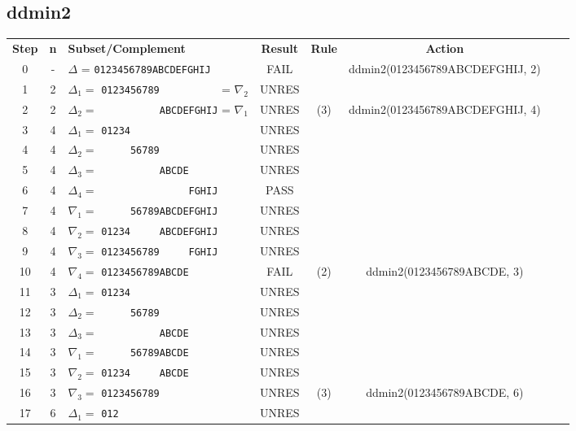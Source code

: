 \documentclass[10pt, a4paper]{article}
\begin{document}
\subsection{ddmin2}
\begin{table}[H]
\def\arraystretch{1.2}
\center
\begin{tabular}{|c|c|l|c|c|c|c|p{1.3cm}|}
	\hline
	\textbf{Step} & \textbf{n} & \textbf{Subset/Complement} &   \textbf{Result} & \textbf{Rule} & \textbf{Action} \\ 
	\hlineB{3}
	0  & - & $\Delta$ = \verb+0123456789ABCDEFGHIJ+ & FAIL &&
	ddmin2(0123456789ABCDEFGHIJ, 2) \\ \hline
	
	1  & 2 & $\Delta_1=$ \verb+0123456789          + = $\nabla_2$ & UNRES && \\
	2  & 2 & $\Delta_2=$ \verb+          ABCDEFGHIJ+ = $\nabla_1$ & UNRES & (3) & ddmin2(0123456789ABCDEFGHIJ, 4) \\ \hline 
	3  & 4 & $\Delta_1=$ \verb+01234                +& UNRES && \\
	4  & 4 & $\Delta_2=$ \verb+     56789           +& UNRES && \\
	5  & 4 & $\Delta_3=$ \verb+          ABCDE      +& UNRES && \\
	6  & 4 & $\Delta_4=$ \verb+               FGHIJ +& PASS && \\
	7  & 4 & $\nabla_1=$ \verb+     56789ABCDEFGHIJ +& UNRES && \\
	8  & 4 & $\nabla_2=$ \verb+01234     ABCDEFGHIJ +& UNRES && \\
	9  & 4 & $\nabla_3=$ \verb+0123456789     FGHIJ +& UNRES && \\
	10 & 4 & $\nabla_4=$ \verb+0123456789ABCDE      +& FAIL & (2) & ddmin2(0123456789ABCDE, 3) \\ \hline
	11  & 3 & $\Delta_1=$ \verb+01234                +& UNRES && \\
	12  & 3 & $\Delta_2=$ \verb+     56789           +& UNRES && \\
	13  & 3 & $\Delta_3=$ \verb+          ABCDE      +& UNRES && \\
	14  & 3 & $\nabla_1=$ \verb+     56789ABCDE      +& UNRES && \\
	15  & 3 & $\nabla_2=$ \verb+01234     ABCDE      +& UNRES && \\
	16 & 3 & $\nabla_3=$ \verb+0123456789            +& UNRES & (3) & ddmin2(0123456789ABCDE, 6) \\ \hline
	17  & 6 & $\Delta_1=$ \verb+012                  +& UNRES && \\

\end{tabular}
\end{table}
\end{document}
